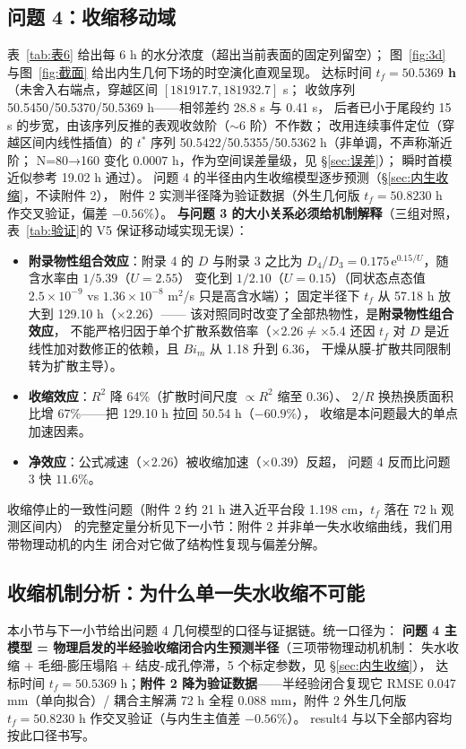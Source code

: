 \documentclass[12pt,a4paper]{ctexart}
\numberwithin{equation}{section}
\begin{document}
\subsection{问题 4：收缩移动域}
表~\ref{tab:表6} 给出每 6 h 的水分浓度（超出当前表面的固定列留空）；
图~\ref{fig:3d} 与图~\ref{fig:截面} 给出内生几何下场的时空演化直观呈现。
达标时间 \textbf{$t_f=50.5369$ h}（未舍入右端点，穿越区间 $[181917.7,181932.7]$ s；
收敛序列 50.5450/50.5370/50.5369 h——相邻差约 28.8 s 与 0.41 s，
后者已小于尾段约 15 s 的步宽，由该序列反推的表观收敛阶（$\sim6$ 阶）不作数；
改用连续事件定位（穿越区间内线性插值）的 $t^*$ 序列
50.5422/50.5355/50.5362 h（非单调，不声称渐近阶；
N=80→160 变化 $0.0007$ h，作为空间误差量级，见 \S\ref{sec:误差}）；
瞬时首模近似参考 19.02 h 通过）。
问题 4 的半径由内生收缩模型逐步预测（\S\ref{sec:内生收缩}，不读附件 2），
附件 2 实测半径降为验证数据（外生几何版 $t_f=50.8230$ h 作交叉验证，偏差 $-0.56\%$）。
\textbf{与问题 3 的大小关系必须给机制解释}（三组对照，表~\ref{tab:验证}的 V5
保证移动域实现无误）：
\begin{itemize}
  \item \textbf{附录物性组合效应}：附录 4 的 $D$ 与附录 3 之比为
        $D_4/D_3=0.175\,\mathrm e^{0.15/U}$，随含水率由 $1/5.39$（$U=2.55$）
        变化到 $1/2.10$（$U=0.15$）（同状态点态值 $2.5\times10^{-9}$ vs
        $1.36\times10^{-8}$ m$^2$/s 只是高含水端）；
        固定半径下 $t_f$ 从 57.18 h 放大到 129.10 h（$\times2.26$）——
        该对照同时改变了全部热物性，是\textbf{附录物性组合效应}，
        不能严格归因于单个扩散系数倍率（$\times2.26\ne\times5.4$ 还因
        $t_f$ 对 $D$ 是近线性加对数修正的依赖，且 $Bi_m$ 从 1.18 升到 6.36，
        干燥从膜-扩散共同限制转为扩散主导）。
  \item \textbf{收缩效应}：$R^2$ 降 64\%（扩散时间尺度 $\propto R^2$ 缩至 0.36）、
        $2/R$ 换热换质面积比增 67\%——把 129.10 h 拉回 50.54 h（$-60.9\%$），
        收缩是本问题最大的单点加速因素。
  \item \textbf{净效应}：公式减速（$\times2.26$）被收缩加速（$\times0.39$）反超，
        问题 4 反而比问题 3 快 $11.6\%$。
\end{itemize}

收缩停止的一致性问题（附件 2 约 21 h 进入近平台段 1.198 cm，$t_f$ 落在 72 h 观测区间内）
的完整定量分析见下一小节：附件 2 并非单一失水收缩曲线，我们用带物理动机的内生
闭合对它做了结构性复现与偏差分解。

\subsection{收缩机制分析：为什么单一失水收缩不可能}\label{sec:收缩机制}
本小节与下一小节给出问题 4 几何模型的口径与证据链。统一口径为：
\textbf{问题 4 主模型 = 物理启发的半经验收缩闭合内生预测半径}（三项带物理动机机制：
失水收缩 + 毛细-膨压塌陷 + 结皮-成孔停滞，5 个标定参数，见 \S\ref{sec:内生收缩}），
达标时间 $t_f=50.5369$ h；\textbf{附件 2 降为验证数据}——半经验闭合复现它
RMSE 0.047 mm（单向拟合）/ 耦合主解满 72 h 全程 0.088 mm，附件 2 外生几何版
$t_f=50.8230$ h 作交叉验证（与内生主值差 $-0.56\%$）。
result4 与以下全部内容均按此口径书写。
\end{document}
